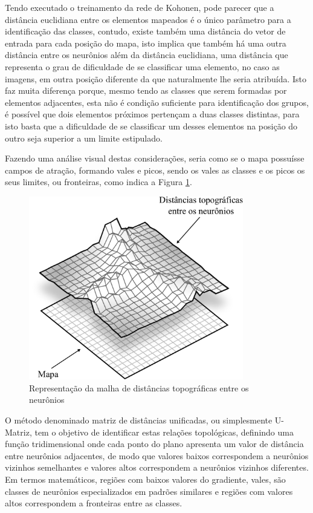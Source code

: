 Tendo executado o treinamento da rede de Kohonen, pode parecer que a distância
euclidiana entre os elementos mapeados é o único parâmetro para a identificação
das classes, contudo, existe também uma distância do vetor de entrada para cada
posição do mapa, isto implica que também há uma outra distância entre os
neurônios além da distância euclidiana, uma distância que representa o grau de
dificuldade de se classificar uma elemento, no caso as imagens, em outra posição
diferente da que naturalmente lhe seria atribuída. Isto faz muita diferença
porque, mesmo tendo as classes que serem formadas por elementos adjacentes, esta
não é condição suficiente para identificação dos grupos, é possível que
dois elementos próximos pertençam a duas classes distintas, para isto basta
que a dificuldade de se classificar um desses elementos na posição do outro seja
superior a um limite estipulado.

Fazendo uma análise visual destas considerações, seria como se o mapa possuísse
campos de atração, formando vales e picos, sendo os vales as classes e os picos
os seus limites, ou fronteiras, como indica a Figura \ref{fig:mapa_x_umatriz}.

\begin{figure}[H]
  \begin{center}
    \includegraphics[height=8cm]{imagens/mapa_x_umatriz.pdf}
  \end{center}
  \caption{ Representação da malha de distâncias topográficas entre os neurônios }
  \label{fig:mapa_x_umatriz}
\end{figure}

O método denominado matriz de distâncias unificadas, ou simplesmente U-Matriz,
tem o objetivo de identificar estas relações topológicas, definindo uma função
tridimensional onde cada ponto do plano apresenta um valor de distância entre
neurônios adjacentes, de modo que valores baixos correspondem a neurônios
vizinhos semelhantes e valores altos correspondem a neurônios vizinhos
diferentes. Em termos matemáticos, regiões com baixos valores do gradiente,
vales, são classes de neurônios especializados em padrões similares e regiões
com valores altos correspondem a fronteiras entre as classes.

